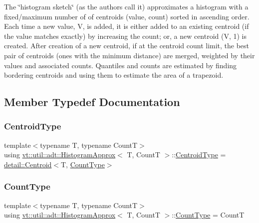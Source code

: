 The \char`\"{}histogram sketch\char`\"{} (as the authors call it) approximates a histogram with a fixed/maximum number of of centroids (value, count) sorted in ascending order. Each time a new value, V, is added, it is either added to an existing centroid (if the value matches exactly) by increasing the count; or, a new centroid (V, 1) is created. After creation of a new centroid, if at the centroid count limit, the best pair of centroids (ones with the minimum distance) are merged, weighted by their values and associated counts. Quantiles and counts are estimated by finding bordering centroids and using them to estimate the area of a trapezoid. 

\subsection{Member Typedef Documentation}
\mbox{\label{structvt_1_1util_1_1adt_1_1_histogram_approx_aabacbad5be3a407cb00938f079177b95}} 
\subsubsection{\texorpdfstring{Centroid\+Type}{CentroidType}}
{\footnotesize\ttfamily template$<$typename T, typename CountT$>$ \\
using \hyperlink{structvt_1_1util_1_1adt_1_1_histogram_approx}{vt\+::util\+::adt\+::\+Histogram\+Approx}$<$ T, CountT $>$\+::\hyperlink{structvt_1_1util_1_1adt_1_1_histogram_approx_aabacbad5be3a407cb00938f079177b95}{Centroid\+Type} =  \hyperlink{structvt_1_1util_1_1adt_1_1detail_1_1_centroid}{detail\+::\+Centroid}$<$T, \hyperlink{structvt_1_1util_1_1adt_1_1_histogram_approx_aa2fb74665588d311da76dd821f2912c6}{Count\+Type}$>$}

\mbox{\label{structvt_1_1util_1_1adt_1_1_histogram_approx_aa2fb74665588d311da76dd821f2912c6}} 
\subsubsection{\texorpdfstring{Count\+Type}{CountType}}
{\footnotesize\ttfamily template$<$typename T, typename CountT$>$ \\
using \hyperlink{structvt_1_1util_1_1adt_1_1_histogram_approx}{vt\+::util\+::adt\+::\+Histogram\+Approx}$<$ T, CountT $>$\+::\hyperlink{structvt_1_1util_1_1adt_1_1_histogram_approx_aa2fb74665588d311da76dd821f2912c6}{Count\+Type} =  CountT}




